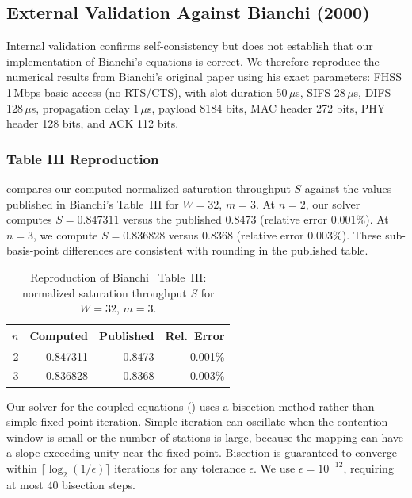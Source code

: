 \documentclass[conference]{IEEEtran}
\begin{document}
\subsection{External Validation Against Bianchi (2000)}
\label{sec:external_val}

Internal validation confirms self-consistency but does not establish
that our implementation of Bianchi's equations is correct.  We therefore
reproduce the numerical results from Bianchi's original paper
\cite{bianchi2000} using his exact parameters: FHSS 1\,Mbps basic
access (no RTS/CTS), with slot duration 50\,$\mu$s, SIFS 28\,$\mu$s,
DIFS 128\,$\mu$s, propagation delay 1\,$\mu$s, payload 8184 bits,
MAC header 272 bits, PHY header 128 bits, and ACK 112 bits.

\subsubsection{Table III Reproduction}

 compares our computed normalized saturation
throughput $S$ against the values published in Bianchi's Table~III for
$W{=}32$, $m{=}3$.  At $n{=}2$, our solver computes $S = 0.847311$
versus the published $0.8473$ (relative error $0.001\%$).  At $n{=}3$,
we compute $S = 0.836828$ versus $0.8368$ (relative error $0.003\%$).
These sub-basis-point differences are consistent with rounding in the
published table.

\begin{table}[t]
\centering
\caption{Reproduction of Bianchi~\cite{bianchi2000} Table~III:
normalized saturation throughput $S$ for $W{=}32$, $m{=}3$.}
\label{tab:bianchi_table3}
\begin{tabular}{@{}rrrr@{}}
\toprule
$n$ & \textbf{Computed} & \textbf{Published} & \textbf{Rel.\ Error} \\
\midrule
2  & 0.847311 & 0.8473 & 0.001\% \\
3  & 0.836828 & 0.8368 & 0.003\% \\
\bottomrule
\end{tabular}
\end{table}

Our solver for the coupled equations () uses a bisection
method rather than simple fixed-point iteration.  Simple iteration can
oscillate when the contention window is small or the number of stations is
large, because the mapping can have a slope exceeding unity near the fixed
point.  Bisection is guaranteed to converge within
$\lceil \log_2(1/\epsilon) \rceil$ iterations for any tolerance $\epsilon$.
We use $\epsilon = 10^{-12}$, requiring at most 40 bisection steps.
\end{document}
